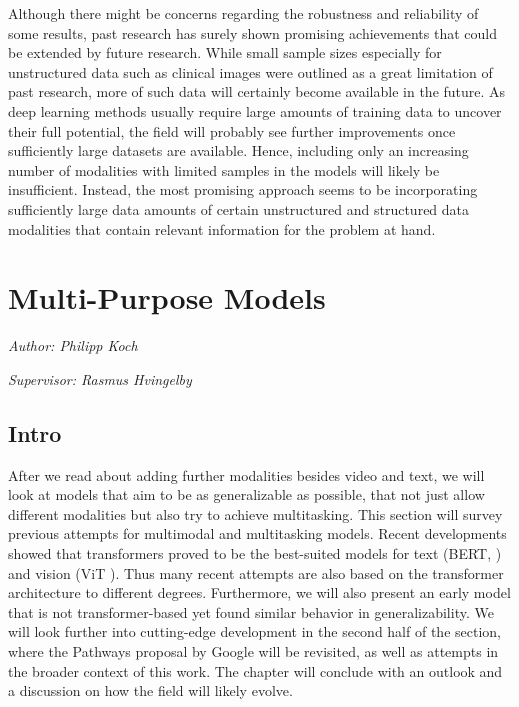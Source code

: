 \documentclass[
]{krantz}
\begin{document}
Although there might be concerns regarding the robustness and reliability of some results, past research has surely shown promising achievements that could be extended by future research. While small sample sizes especially for unstructured data such as clinical images were outlined as a great limitation of past research, more of such data will certainly become available in the future. As deep learning methods usually require large amounts of training data to uncover their full potential, the field will probably see further improvements once sufficiently large datasets are available. Hence, including only an increasing number of modalities with limited samples in the models will likely be insufficient. Instead, the most promising approach seems to be incorporating sufficiently large data amounts of certain unstructured and structured data modalities that contain relevant information for the problem at hand.

\hypertarget{c03-03-multi-purpose}{%
\section{Multi-Purpose Models}\label{c03-03-multi-purpose}}

\emph{Author: Philipp Koch}

\emph{Supervisor: Rasmus Hvingelby}

\hypertarget{intro-1}{%
\subsection{Intro}\label{intro-1}}

After we read about adding further modalities besides video and text, we will look at models that aim to be as generalizable as possible, that not
just allow different modalities but also try to achieve multitasking. This section will survey previous attempts for multimodal and multitasking models.
Recent developments showed that transformers \citep{vaswani2017attention} proved to be the best-suited models for text (BERT, \citet{Devlin2018}) and vision (ViT \citet{dosovitskiy2020image}). Thus many recent attempts are also based on the transformer architecture to different degrees. Furthermore, we will also present an early model that is not transformer-based yet found similar behavior in generalizability.
We will look further into cutting-edge development in the second half of the section, where the Pathways proposal by Google \citep{Dean21} will be revisited, as well as attempts in the broader context of this work. The chapter will conclude with an outlook and a discussion on how the field will likely evolve.
\end{document}
